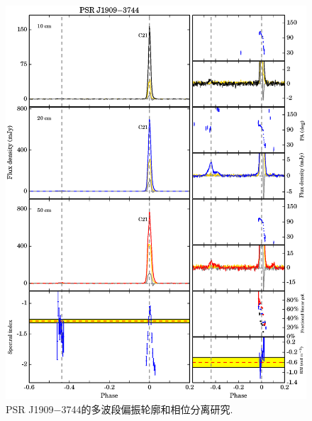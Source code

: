 \begin{figure}
\begin{center}
\includegraphics[width=6 in]{1909.ps}
\caption{PSR J1909$-$3744的多波段偏振轮廓和相位分离研究.}
\label{1909}
\end{center}
\end{figure}

